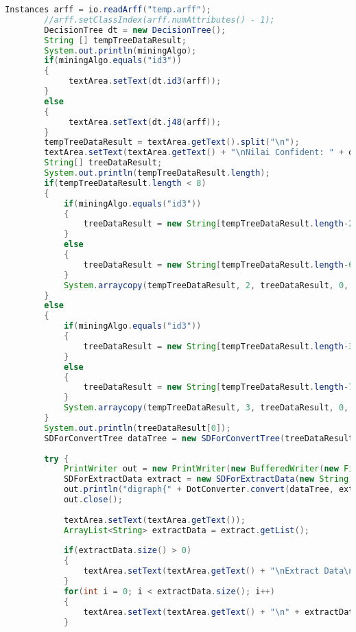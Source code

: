 \begin{lstlisting}[language=Java,basicstyle=\tiny,caption=Controller.java]
        Instances arff = io.readArff("temp.arff");
        //arff.setClassIndex(arff.numAttributes() - 1);
        DecisionTree dt = new DecisionTree();
        String [] tempTreeDataResult;
        System.out.println(miningAlgo);
        if(miningAlgo.equals("id3"))
        {
             textArea.setText(dt.id3(arff));
        }
        else
        {
             textArea.setText(dt.j48(arff));
        }
        tempTreeDataResult = textArea.getText().split("\n");
        textArea.setText(textArea.getText() + "\nNilai Confident: " + dt.calculatePrecision(arff) + "\n");
        String[] treeDataResult;
        System.out.println(tempTreeDataResult.length);
        if(tempTreeDataResult.length < 8)
        {
            if(miningAlgo.equals("id3"))
            {
                treeDataResult = new String[tempTreeDataResult.length-2];
            }
            else
            {
                treeDataResult = new String[tempTreeDataResult.length-6];
            }
            System.arraycopy(tempTreeDataResult, 2, treeDataResult, 0, treeDataResult.length);
        }
        else
        {
            if(miningAlgo.equals("id3"))
            {
                treeDataResult = new String[tempTreeDataResult.length-3];
            }
            else
            {
                treeDataResult = new String[tempTreeDataResult.length-7];
            }
            System.arraycopy(tempTreeDataResult, 3, treeDataResult, 0, treeDataResult.length);
        }
        System.out.println(treeDataResult[0]);
        SDForConvertTree dataTree = new SDForConvertTree(treeDataResult);
        
        try {
            PrintWriter out = new PrintWriter(new BufferedWriter(new FileWriter("tree.txt")));
            SDForExtractData extract = new SDForExtractData(new String[]{"bulan", "tahun", "hari", "jam"},new int[]{maxMin[0],maxMin[1],7,24}, new int[]{maxMin[2],maxMin[3],1,0});
            out.println("digraph{" + DotConverter.convert(dataTree, extract, miningAlgo, 0, "") + "}");
            out.close();
            
            textArea.setText(textArea.getText());
            ArrayList<String> extractData = extract.getList();
            
            if(extractData.size() > 0)
            {
                textArea.setText(textArea.getText() + "\nExtract Data\n");
            }
            for(int i = 0; i < extractData.size(); i++)
            {
                textArea.setText(textArea.getText() + "\n" + extractData.get(i));
            }
            

\end{lstlisting}

